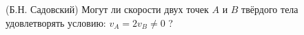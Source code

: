 (Б.Н. Садовский)
Могут ли скорости двух точек $A$ и $B$ твёрдого тела удовлетворять
условию: $v_A=2v_B\neq0$ ?
